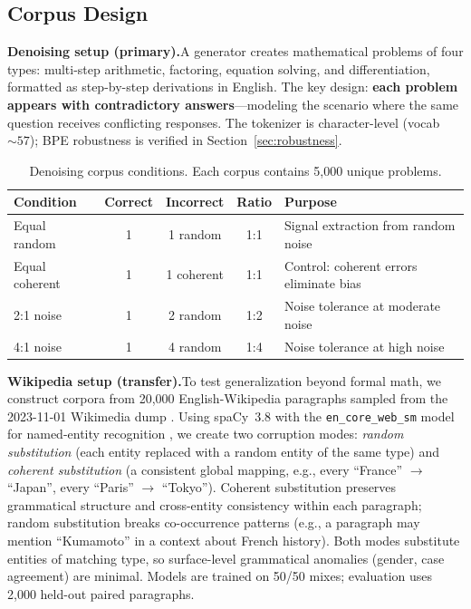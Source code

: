 \documentclass{article}
\begin{document}
\subsection{Corpus Design}
\label{sec:corpus}

\textbf{Denoising setup (primary).}\quad A generator creates mathematical problems of four types: multi-step arithmetic, factoring, equation solving, and differentiation, formatted as step-by-step derivations in English. The key design: \textbf{each problem appears with contradictory answers}---modeling the scenario where the same question receives conflicting responses. The tokenizer is character-level (vocab ${\sim}57$); BPE robustness is verified in Section~\ref{sec:robustness}.

\begin{table}[h]
\centering
\small
\begin{tabular}{lcccp{4.5cm}}
\toprule
Condition & Correct & Incorrect & Ratio & Purpose \\
\midrule
Equal random   & 1 & 1 random   & 1:1 & Signal extraction from random noise \\
Equal coherent & 1 & 1 coherent & 1:1 & Control: coherent errors eliminate bias \\
2:1 noise      & 1 & 2 random   & 1:2 & Noise tolerance at moderate noise \\
4:1 noise      & 1 & 4 random   & 1:4 & Noise tolerance at high noise \\
\bottomrule
\end{tabular}
\caption{Denoising corpus conditions. Each corpus contains 5,000 unique problems.}
\label{tab:conditions}
\end{table}

\textbf{Wikipedia setup (transfer).}\quad To test generalization beyond formal math, we construct corpora from 20{,}000 English-Wikipedia paragraphs sampled from the 2023-11-01 Wikimedia dump \citep{wikimedia2023enwiki}. Using spaCy~3.8 with the \texttt{en\_core\_web\_sm} model for named-entity recognition \citep{honnibal2020spacy}, we create two corruption modes: \emph{random substitution} (each entity replaced with a random entity of the same type) and \emph{coherent substitution} (a consistent global mapping, e.g., every ``France'' $\to$ ``Japan'', every ``Paris'' $\to$ ``Tokyo''). Coherent substitution preserves grammatical structure and cross-entity consistency within each paragraph; random substitution breaks co-occurrence patterns (e.g., a paragraph may mention ``Kumamoto'' in a context about French history). Both modes substitute entities of matching type, so surface-level grammatical anomalies (gender, case agreement) are minimal. Models are trained on 50/50 mixes; evaluation uses 2{,}000 held-out paired paragraphs.
\end{document}
